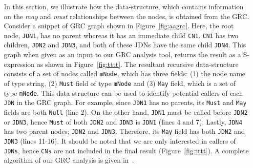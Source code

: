 In this section, we illustrate how the data-structure, which contains
information on the \textit{may} and \textit{must} relationships between
the nodes, is obtained from the GRC. Consider a snippet of GRC graph
shown in Figure~\ref{fig:aagrc}. Here, the root node, \texttt{JDN1}, has
no parent whereas it has an immediate child \texttt{CN1}. \texttt{CN1}
has two children, \texttt{JDN2} and \texttt{JDN3}, and both of these
JDNs have the same child \texttt{JDN4}. This graph when given as an
input to our GRC analysis tool, returns the result as a S-expression as
shown in Figure~\ref{fig:tttt}. The resultant recursive data-structure
consists of a set of nodes called \texttt{mNode}, which has three
fields: (1) the node name of type string, (2) \texttt{Must} field of
type \texttt{mNode} and (3) \texttt{May} field, which is a set of type
\texttt{mNode}. This data-structure can be used to identify potential
callers of each \texttt{JDN} in the GRC graph. For example, since
\texttt{JDN1} has no parents, its \texttt{Must} and \texttt{May} fields
are both \texttt{Null} (line 2).  On the other hand, \texttt{JDN1} must
be called before \texttt{JDN2} or \texttt{JDN3}, hence \texttt{Must} of
both \texttt{JDN2} and \texttt{JDN3} is \texttt{JDN1} (lines 4 and 7).
Lastly, \texttt{JDN4} has two parent nodes; \texttt{JDN2} and
\texttt{JDN3}. Therefore, its \texttt{May} field has both \texttt{JDN2}
and \texttt{JDN3} (lines 11-16). It should be noted that we are only
interested in callers of \texttt{JDNs}, hence \texttt{CNs} are not
included in the final result (Figure~\ref{fig:tttt}). A complete
algorithm of our GRC analysis is given in~\cite{supp_amal02916}.







